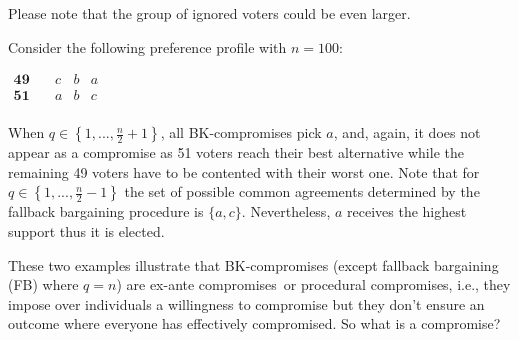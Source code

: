 \documentclass[version=3.21, pagesize, notitlepage, twoside=off, bibliography=totoc, DIV=calc, fontsize=11pt, a4paper]{scrartcl}
\begin{document}
\noindent Please note that the group of ignored voters could be even larger.
\begin{example}
	Consider the following preference profile with $n=100$:
	\begin{center}
		$
		\begin{array}{cccc}
		\mathbf{49} \quad &c&b&a\\
		\mathbf{51} \quad &a&b&c\\
		\end{array}
		$
	\end{center}
	When $q\in \left\{ 1,..., \frac{n}{2} +1\right\} $, all BK-compromises pick $a$, and, again, it does not appear as a compromise as 51 voters reach their best alternative while the remaining 49 voters have to be contented with their worst one. Note that for $q\in \left\{ 1,..., \frac{n}{2} -1 \right\} $ the set of possible common agreements determined by the fallback bargaining procedure is $\{a,c\}$. Nevertheless, $a$ receives the highest support thus it is elected.
\end{example}

These two examples illustrate that BK-compromises (except fallback bargaining (FB) where $q=n$) are \oquot ex-ante compromises\cquot \ or \oquot procedural compromises\cquot, i.e., they impose over individuals a willingness to compromise but they don't ensure an outcome where everyone has effectively compromised. So what is a compromise?

\end{document}
